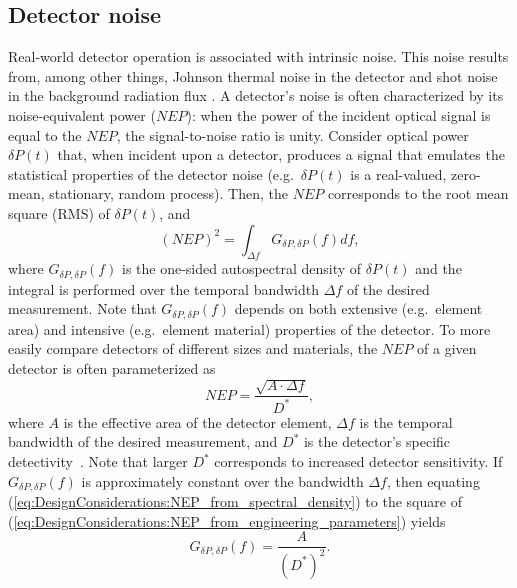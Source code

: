 \subsection{Detector noise}
\label{sec:DesignConsiderations:amplitude_noise:detector}
Real-world detector operation is associated with intrinsic noise.
This noise results from, among other things,
Johnson thermal noise in the detector and
shot noise in the background radiation flux
\cite{hamamatsu_ir_detectors}.
A detector's noise is often characterized by
its noise-equivalent power ($NEP$):
when the power of the incident optical signal is equal to the $NEP$,
the signal-to-noise ratio is unity.
Consider optical power $\delta P(t)$ that, when incident upon a detector,
produces a signal that
emulates the statistical properties of the detector noise
(e.g.\ $\delta P(t)$ is a real-valued, zero-mean, stationary, random process).
Then, the $NEP$ corresponds to the root mean square (RMS) of $\delta P(t)$,
and
\begin{equation}
  (NEP)^2
  =
  \int_{\Delta f}
  G_{\delta P, \delta P}(f) df,
  \label{eq:DesignConsiderations:NEP_from_spectral_density}
\end{equation}
where $G_{\delta P, \delta P}(f)$ is
the one-sided autospectral density of $\delta P(t)$ and
the integral is performed over the temporal bandwidth $\Delta f$
of the desired measurement.
Note that $G_{\delta P, \delta P}(f)$ depends on both
extensive (e.g.\ element area) and intensive (e.g.\ element material)
properties of the detector.
To more easily compare detectors of different sizes and materials,
the $NEP$ of a given detector is often parameterized as
\begin{equation}
  NEP = \frac{\sqrt{A \cdot \Delta f}}{D^{*}},
  \label{eq:DesignConsiderations:NEP_from_engineering_parameters}
\end{equation}
where $A$ is the effective area of the detector element,
$\Delta f$ is the temporal bandwidth of the desired measurement, and
$D^{*}$ is the detector's specific detectivity~\cite{jones_josa60}.
Note that larger $D^{*}$ corresponds to increased detector sensitivity.
If $G_{\delta P, \delta P}(f)$ is approximately constant
over the bandwidth $\Delta f$, then equating
(\ref{eq:DesignConsiderations:NEP_from_spectral_density})
to the square of
(\ref{eq:DesignConsiderations:NEP_from_engineering_parameters})
yields
\begin{equation}
  G_{\delta P, \delta P}(f)
  =
  \frac{A}{(D^*)^2}.
  \label{eq:DesignConsiderations:NEP_spectral_density}
\end{equation}

